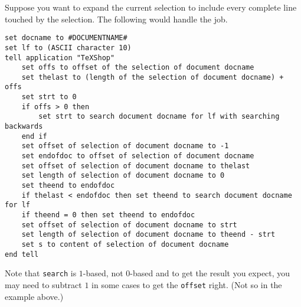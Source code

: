 \documentclass[11pt]{amsart}
\begin{document}
Suppose you want to expand the current selection to include every complete line touched by the selection. The following would handle the job.
\begin{verbatim}
set docname to #DOCUMENTNAME#
set lf to (ASCII character 10)
tell application "TeXShop"
    set offs to offset of the selection of document docname
    set thelast to (length of the selection of document docname) + offs
    set strt to 0
    if offs > 0 then 
        set strt to search document docname for lf with searching backwards
    end if
    set offset of selection of document docname to -1
    set endofdoc to offset of selection of document docname
    set offset of selection of document docname to thelast
    set length of selection of document docname to 0
    set theend to endofdoc
    if thelast < endofdoc then set theend to search document docname for lf
    if theend = 0 then set theend to endofdoc
    set offset of selection of document docname to strt
    set length of selection of document docname to theend - strt
    set s to content of selection of document docname
end tell
\end{verbatim}
Note that {\tt search} is $1$-based, not $0$-based and to get the result you expect, you may need to subtract $1$ in some cases  to get the {\tt offset} right. (Not so in the example above.)
\end{document}
